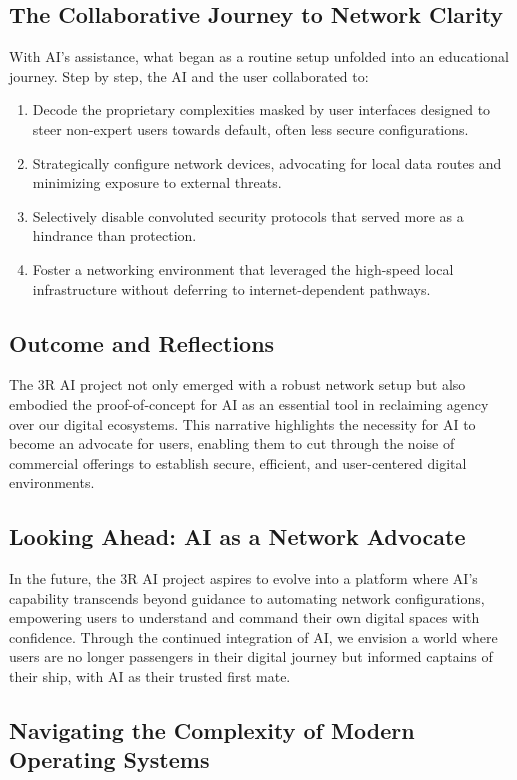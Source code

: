 \documentclass[12pt]{article}
\begin{document}
\subsection{The Collaborative Journey to Network Clarity}
With AI's assistance, what began as a routine setup unfolded into an educational journey. Step by step, the AI and the user collaborated to:
\begin{enumerate}
    \item Decode the proprietary complexities masked by user interfaces designed to steer non-expert users towards default, often less secure configurations.
    \item Strategically configure network devices, advocating for local data routes and minimizing exposure to external threats.
    \item Selectively disable convoluted security protocols that served more as a hindrance than protection.
    \item Foster a networking environment that leveraged the high-speed local infrastructure without deferring to internet-dependent pathways.
\end{enumerate}

\subsection{Outcome and Reflections}
The 3R AI project not only emerged with a robust network setup but also embodied the proof-of-concept for AI as an essential tool in reclaiming agency over our digital ecosystems. This narrative highlights the necessity for AI to become an advocate for users, enabling them to cut through the noise of commercial offerings to establish secure, efficient, and user-centered digital environments.

\subsection{Looking Ahead: AI as a Network Advocate}
In the future, the 3R AI project aspires to evolve into a platform where AI's capability transcends beyond guidance to automating network configurations, empowering users to understand and command their own digital spaces with confidence. Through the continued integration of AI, we envision a world where users are no longer passengers in their digital journey but informed captains of their ship, with AI as their trusted first mate.

\subsection{Navigating the Complexity of Modern Operating Systems}
\end{document}
